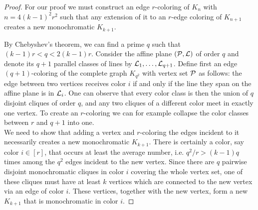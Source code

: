 \documentclass[12pt]{article}
\newcommand{\cG}{{\cal G}}
\newcommand{\cL}{{\cal L}}
\newcommand{\cP}{{\cal P}}
\theoremstyle{definition}
\begin{document}
	\begin{proof} For our proof we must construct an edge $r$-coloring of $K_n$ with $n=4(k-1)^2r^2$ such that any extension of it to an $r$-edge coloring of $K_{n+1}$ creates a new monochromatic $K_{k+1}$. 

		By Chebyshev's theorem, we can find a prime $q$ such that $(k-1)r < q < 2(k-1)r$.         
        Consider the affine plane $(\cP,\cL)$ of order $q$ and denote its $q+1$ parallel classes of lines by $\cL_1,\dots,\cL_{q+1}$. 
        Define first an edge $(q+1)$-coloring of the complete graph $K_{q^2}$
        with vertex set $\cP$ as follows: 
   the edge between two vertices receives color $i$ if and only if the line they span on the affine plane is in $\cL_i$. One can observe that every color class is then the union of $q$ disjoint cliques of order $q$, and any two cliques of a different color meet in exactly one vertex. To create an $r$-coloring we can for example collapse the color classes between $r$ and $q+1$ into one.\\
	We need to show that adding a vertex and $r$-coloring the edges incident to it necessarily creates a new monochromatic $K_{k+1}$. There is certainly a color, say color $i \in [r]$, that occurs at least the average number, i.e. $q^2/r > (k-1)q$ times among the $q^2$ edges incident to the new vertex. Since there are $q$ pairwise disjoint monochromatic cliques in color $i$ covering the whole vertex set, one of these cliques must have at least $k$ vertices which are connected to the new vertex via an edge of color $i$. These vertices, together with the new vertex, form a new $K_{k+1}$ that is monochromatic in color $i$.    
%		
	\end{proof}
	
\end{document}
